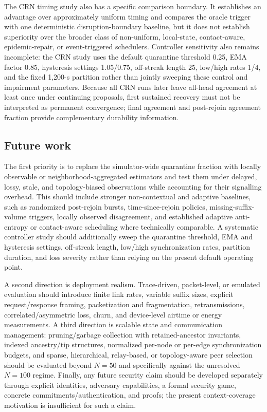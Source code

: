\documentclass[11pt]{article}
\begin{document}
The CRN timing study also has a specific comparison boundary. It establishes an advantage over approximately uniform timing and compares the oracle trigger with one deterministic disruption-boundary baseline, but it does not establish superiority over the broader class of non-uniform, local-state, contact-aware, epidemic-repair, or event-triggered schedulers. Controller sensitivity also remains incomplete: the CRN study uses the default quarantine threshold 0.25, EMA factor 0.85, hysteresis settings 1.05/0.75, off-streak length 25, low/high rates 1/4, and the fixed 1,200-s partition rather than jointly sweeping these control and impairment parameters. Because all CRN runs later leave all-head agreement at least once under continuing proposals, first sustained recovery must not be interpreted as permanent convergence; final agreement and post-rejoin agreement fraction provide complementary durability information.

\subsection{Future work}
The first priority is to replace the simulator-wide quarantine fraction with locally observable or neighborhood-aggregated estimators and test them under delayed, lossy, stale, and topology-biased observations while accounting for their signalling overhead. This should include stronger non-contextual and adaptive baselines, such as randomized post-rejoin bursts, time-since-rejoin policies, missing-suffix-volume triggers, locally observed disagreement, and established adaptive anti-entropy or contact-aware scheduling where technically comparable. A systematic controller study should additionally sweep the quarantine threshold, EMA and hysteresis settings, off-streak length, low/high synchronization rates, partition duration, and loss severity rather than relying on the present default operating point.

A second direction is deployment realism. Trace-driven, packet-level, or emulated evaluation should introduce finite link rates, variable suffix sizes, explicit request/response framing, packetization and fragmentation, retransmissions, correlated/asymmetric loss, churn, and device-level airtime or energy measurements. A third direction is scalable state and communication management: pruning/garbage collection with retained-ancestor invariants, indexed ancestry/tip structures, normalized per-node or per-edge synchronization budgets, and sparse, hierarchical, relay-based, or topology-aware peer selection should be evaluated beyond $N=50$ and specifically against the unresolved $N=100$ regime. Finally, any future security claim should be developed separately through explicit identities, adversary capabilities, a formal security game, concrete commitments/authentication, and proofs; the present context-coverage motivation is insufficient for such a claim.
\end{document}
